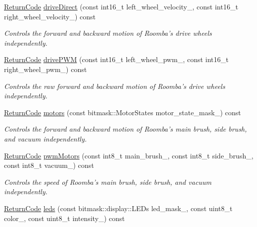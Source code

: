 \begin{DoxyCompactItemize}
\hyperlink{classroomba_1_1series500_1_1_open_interface_a43fc2ae1216e57cfb46901331b9ab4c7}{Return\+Code} \hyperlink{classroomba_1_1series500_1_1_open_interface_aa528b5978d391829da67cc582beac9b9}{drive\+Direct} (const int16\+\_\+t left\+\_\+wheel\+\_\+velocity\+\_\+, const int16\+\_\+t right\+\_\+wheel\+\_\+velocity\+\_\+) const 
\begin{DoxyCompactList}\small\item\em Controls the forward and backward motion of Roomba’s drive wheels independently. \end{DoxyCompactList}\item 
\hyperlink{classroomba_1_1series500_1_1_open_interface_a43fc2ae1216e57cfb46901331b9ab4c7}{Return\+Code} \hyperlink{classroomba_1_1series500_1_1_open_interface_a57c4e739264089ea5982a2f17727d108}{drive\+P\+W\+M} (const int16\+\_\+t left\+\_\+wheel\+\_\+pwm\+\_\+, const int16\+\_\+t right\+\_\+wheel\+\_\+pwm\+\_\+) const 
\begin{DoxyCompactList}\small\item\em Controls the raw forward and backward motion of Roomba’s drive wheels independently. \end{DoxyCompactList}\item 
\hyperlink{classroomba_1_1series500_1_1_open_interface_a43fc2ae1216e57cfb46901331b9ab4c7}{Return\+Code} \hyperlink{classroomba_1_1series500_1_1_open_interface_a350b0236512caa59c8b887ad58e0ad95}{motors} (const bitmask\+::\+Motor\+States motor\+\_\+state\+\_\+mask\+\_\+) const 
\begin{DoxyCompactList}\small\item\em Controls the forward and backward motion of Roomba’s main brush, side brush, and vacuum independently. \end{DoxyCompactList}\item 
\hyperlink{classroomba_1_1series500_1_1_open_interface_a43fc2ae1216e57cfb46901331b9ab4c7}{Return\+Code} \hyperlink{classroomba_1_1series500_1_1_open_interface_ad5bfebf55b685a6c793bb948618bd265}{pwm\+Motors} (const int8\+\_\+t main\+\_\+brush\+\_\+, const int8\+\_\+t side\+\_\+brush\+\_\+, const int8\+\_\+t vacuum\+\_\+) const 
\begin{DoxyCompactList}\small\item\em Controls the speed of Roomba’s main brush, side brush, and vacuum independently. \end{DoxyCompactList}\item 
\hyperlink{classroomba_1_1series500_1_1_open_interface_a43fc2ae1216e57cfb46901331b9ab4c7}{Return\+Code} \hyperlink{classroomba_1_1series500_1_1_open_interface_a02b07148f3745190241059eca07bcad9}{leds} (const bitmask\+::display\+::\+L\+E\+Ds led\+\_\+mask\+\_\+, const uint8\+\_\+t color\+\_\+, const uint8\+\_\+t intensity\+\_\+) const 

\end{DoxyCompactItemize}
